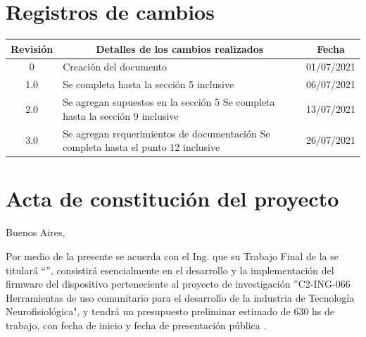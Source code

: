 \documentclass[
11pt, %
codirector, %
]{charter}
\begin{document}
\maketitle
\thispagestyle{empty}
\pagebreak


\thispagestyle{empty}
{\setlength{\parskip}{0pt}
\tableofcontents{}
}
\pagebreak


\section*{Registros de cambios}
\label{sec:registro}


\begin{table}[ht]
\label{tab:registro}
\centering
\begin{tabularx}{\linewidth}{@{}|c|X|c|@{}}
\hline
\rowcolor[HTML]{C0C0C0} 
Revisión & \multicolumn{1}{c|}{\cellcolor[HTML]{C0C0C0}Detalles de los cambios realizados} & Fecha      \\ \hline
0      & Creación del documento                              & 01/07/2021 \\ \hline
1.0      & Se completa hasta la sección 5 inclusive          & 06/07/2021 \\ \hline
2.0      & Se agregan supuestos en la sección 5 \newline
		   Se completa hasta la sección 9 inclusive				 & 13/07/2021 \\ \hline
3.0      & Se agregan requerimientos de documentación \newline
		   Se completa hasta el punto 12 inclusive                & 26/07/2021 \\ \hline
\end{tabularx}
\end{table}

\pagebreak



\section*{Acta de constitución del proyecto}
\label{sec:acta}

\begin{flushright}
Buenos Aires, \fechaInicioName
\end{flushright}

\vspace{2cm}

Por medio de la presente se acuerda con el Ing. \authorname\hspace{1px} que su Trabajo Final de la \degreename\hspace{1px} se titulará ``\ttitle'', consistirá esencialmente en el desarrollo y la implementación del firmware del dispositivo perteneciente al proyecto de investigación ''C2-ING-066 Herramientas de uso comunitario para el desarrollo de la industria de Tecnología Neurofisiológica", y tendrá un presupuesto preliminar estimado de 630 hs de trabajo, con fecha de inicio \fechaInicioName\hspace{1px} y fecha de presentación pública \fechaFinalName.
\end{document}
